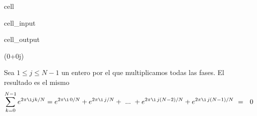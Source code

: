 \documentclass[letterpaper,10pt,english]{jupyterBook}
\begin{document}
\begin{sphinxuseclass}{cell}
\begin{sphinxVerbatimInput}
\begin{sphinxuseclass}{cell_input}
\end{sphinxuseclass}\end{sphinxVerbatimInput}
\begin{sphinxVerbatimOutput}

\begin{sphinxuseclass}{cell_output}
\begin{sphinxVerbatim}[commandchars=\\\{\}]
(\PYGZhy{}0+0j)
\end{sphinxVerbatim}

\noindent{}

\end{sphinxuseclass}\end{sphinxVerbatimOutput}

\end{sphinxuseclass}
\sphinxAtStartPar
Sea  \(1\leq j \leq N-1\) un entero por el que multiplicamos todas las fases. El resultado es el mismo
\begin{equation*}
\begin{split}
\sum_{k=0}^{N-1} e^{2\pi \i j k/N} =   e^{2\pi \i\, 0/N} +  e^{2\pi \i\, j/N}  +~...~ +   e^{2\pi \i\, j(N-2)/N}+   e^{2\pi \i\, j(N-1)/N} ~=~  ~0
 \end{split}
\end{equation*}
\end{document}
